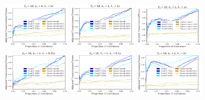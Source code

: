 \documentclass[a4paper,11pt]{article}
\begin{document}
\begin{figure}[!h]
\centering
\includegraphics[width=0.3\textwidth]{figs/results_efficacy_normalized_individual_SAMPLE-FIRSTART_ARTRATE-4.pdf}
\includegraphics[width=0.3\textwidth]{figs/results_efficacy_normalized_individual_SAMPLE-FIRSTART_ARTRATE-2.pdf}
\includegraphics[width=0.3\textwidth]{figs/results_efficacy_normalized_individual_SAMPLE-FIRSTART_ARTRATE-1.pdf}\\
\includegraphics[width=0.3\textwidth]{figs/results_efficacy_normalized_individual_SAMPLE-FIRSTART_STOPRATE-0.25x.pdf}
\includegraphics[width=0.3\textwidth]{figs/results_efficacy_normalized_individual_SAMPLE-FIRSTART_STOPRATE-0.5x.pdf}
\includegraphics[width=0.3\textwidth]{figs/results_efficacy_normalized_individual_SAMPLE-FIRSTART_STOPRATE-2x.pdf}\\

\end{figure}
\end{document}
